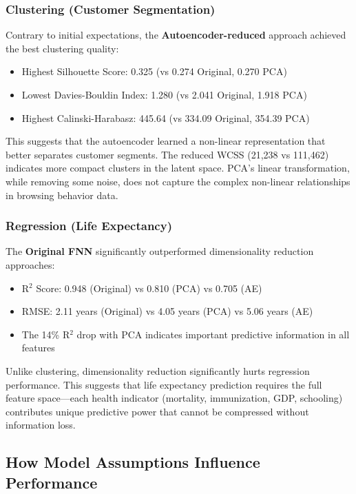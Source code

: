 \documentclass[11pt,a4paper]{article}
\begin{document}
\subsubsection{Clustering (Customer Segmentation)}

Contrary to initial expectations, the \textbf{Autoencoder-reduced} approach achieved the best clustering quality:

\begin{itemize}
    \item Highest Silhouette Score: 0.325 (vs 0.274 Original, 0.270 PCA)
    \item Lowest Davies-Bouldin Index: 1.280 (vs 2.041 Original, 1.918 PCA)
    \item Highest Calinski-Harabasz: 445.64 (vs 334.09 Original, 354.39 PCA)
\end{itemize}

This suggests that the autoencoder learned a non-linear representation that better separates customer segments. The reduced WCSS (21,238 vs 111,462) indicates more compact clusters in the latent space. PCA's linear transformation, while removing some noise, does not capture the complex non-linear relationships in browsing behavior data.

\subsubsection{Regression (Life Expectancy)}

The \textbf{Original FNN} significantly outperformed dimensionality reduction approaches:

\begin{itemize}
    \item R$^2$ Score: 0.948 (Original) vs 0.810 (PCA) vs 0.705 (AE)
    \item RMSE: 2.11 years (Original) vs 4.05 years (PCA) vs 5.06 years (AE)
    \item The 14\% R$^2$ drop with PCA indicates important predictive information in all features
\end{itemize}

Unlike clustering, dimensionality reduction significantly hurts regression performance. This suggests that life expectancy prediction requires the full feature space---each health indicator (mortality, immunization, GDP, schooling) contributes unique predictive power that cannot be compressed without information loss.

\subsection{How Model Assumptions Influence Performance}
\end{document}
